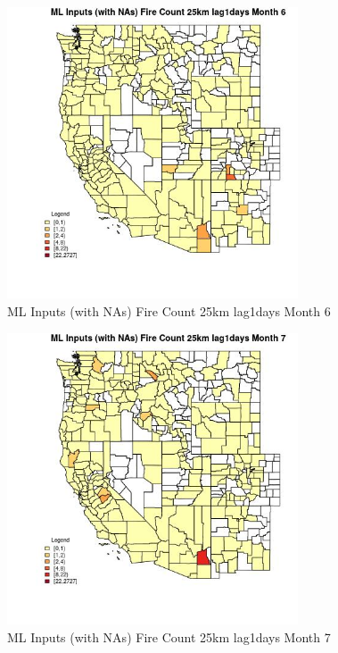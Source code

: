 \begin{figure} 
\centering  
\includegraphics[width=0.77\textwidth]{Code_Outputs/Report_ML_input_PM25_Step4_part_f_de_duplicated_aves_prioritize_24hr_obswNAs_CountyFire_Count_25km_lag1daysmedianMonth6.jpg} 
\caption{\label{fig:Report_ML_input_PM25_Step4_part_f_de_duplicated_aves_prioritize_24hr_obswNAsCountyFire_Count_25km_lag1daysmedianMonth6}ML Inputs (with NAs) Fire Count 25km lag1days Month 6} 
\end{figure} 
 

\begin{figure} 
\centering  
\includegraphics[width=0.77\textwidth]{Code_Outputs/Report_ML_input_PM25_Step4_part_f_de_duplicated_aves_prioritize_24hr_obswNAs_CountyFire_Count_25km_lag1daysmedianMonth7.jpg} 
\caption{\label{fig:Report_ML_input_PM25_Step4_part_f_de_duplicated_aves_prioritize_24hr_obswNAsCountyFire_Count_25km_lag1daysmedianMonth7}ML Inputs (with NAs) Fire Count 25km lag1days Month 7} 
\end{figure} 
 

